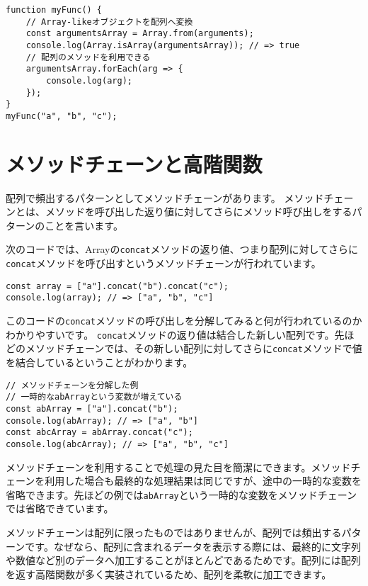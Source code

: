 \begin{tcolorbox}[enhanced jigsaw,breakable,title=Array-likeオブジェクト]
\begin{lstlisting}
function myFunc() {
    // Array-likeオブジェクトを配列へ変換
    const argumentsArray = Array.from(arguments);
    console.log(Array.isArray(argumentsArray)); // => true
    // 配列のメソッドを利用できる
    argumentsArray.forEach(arg => {
        console.log(arg);
    });
}
myFunc("a", "b", "c");
\end{lstlisting}
\end{tcolorbox}

\hypertarget{method-chain-and-high-order-function}{%
\section{メソッドチェーンと高階関数}\label{method-chain-and-high-order-function}}

配列で頻出するパターンとしてメソッドチェーンがあります。
メソッドチェーンとは、メソッドを呼び出した返り値に対してさらにメソッド呼び出しをするパターンのことを言います。

次のコードでは、Arrayの\texttt{concat}メソッドの返り値、つまり配列に対してさらに\texttt{concat}メソッドを呼び出すというメソッドチェーンが行われています。

\begin{lstlisting}
const array = ["a"].concat("b").concat("c");
console.log(array); // => ["a", "b", "c"]
\end{lstlisting}

このコードの\texttt{concat}メソッドの呼び出しを分解してみると何が行われているのかわかりやすいです。
\texttt{concat}メソッドの返り値は結合した新しい配列です。先ほどのメソッドチェーンでは、その新しい配列に対してさらに\texttt{concat}メソッドで値を結合しているということがわかります。

\begin{lstlisting}
// メソッドチェーンを分解した例
// 一時的なabArrayという変数が増えている
const abArray = ["a"].concat("b");
console.log(abArray); // => ["a", "b"]
const abcArray = abArray.concat("c");
console.log(abcArray); // => ["a", "b", "c"]
\end{lstlisting}

メソッドチェーンを利用することで処理の見た目を簡潔にできます。メソッドチェーンを利用した場合も最終的な処理結果は同じですが、途中の一時的な変数を省略できます。先ほどの例では\texttt{abArray}という一時的な変数をメソッドチェーンでは省略できています。

メソッドチェーンは配列に限ったものではありませんが、配列では頻出するパターンです。なぜなら、配列に含まれるデータを表示する際には、最終的に文字列や数値など別のデータへ加工することがほとんどであるためです。配列には配列を返す高階関数が多く実装されているため、配列を柔軟に加工できます。

